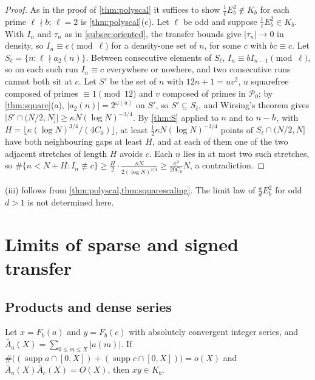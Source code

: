 \documentclass[11pt]{article}
\DeclareMathOperator{\supp}{supp}
\newcommand{\cnt}{\#}
\begin{document}
\begin{proof}
As in the proof of \cref{thm:polyscal} it suffices to show $\frac1\ell E_b^2\notin K_b$ for each prime
$\ell\nmid b$; $\ell=2$ is \cref{thm:polyscal}(c). Let $\ell$ be odd and suppose
$\frac1\ell E_b^2\in K_b$. With $I_n$ and $\tau_n$ as in \cref{subsec:oriented}, the transfer bounds
give $|\tau_n|\to0$ in density, so $I_n\equiv c\pmod\ell$ for a density-one set of $n$, for some $c$
with $bc\equiv c$. Let $S_\ell=\{n:\ell\nmid a_2(n)\}$. Between consecutive elements of $S_\ell$,
$I_n\equiv bI_{n-1}\pmod\ell$, so on each such run $I_n\equiv c$ everywhere or nowhere, and two
consecutive runs cannot both sit at $c$. Let $S'$ be the set of $n$ with $12n+1=uv^2$, $u$ squarefree
composed of primes $\equiv1\pmod{12}$ and $v$ composed of primes in $\mathcal P_0$; by
\cref{thm:square}(a), $|a_2(n)|=2^{\omega(u)}$ on $S'$, so $S'\subseteq S_\ell$, and Wirsing's theorem
gives $|S'\cap(N/2,N]|\ge\kappa N(\log N)^{-3/4}$. By \cref{thm:S} applied to $n$ and to $n-h$, with
$H=\lfloor\kappa(\log N)^{3/4}/(4C_0)\rfloor$, at least $\frac12\kappa N(\log N)^{-3/4}$ points of
$S_\ell\cap(N/2,N]$ have both neighbouring gaps at least $H$, and at each of them one of the two
adjacent stretches of length $H$ avoids $c$. Each $n$ lies in at most two such stretches, so
$\cnt\{n<N+H:I_n\not\equiv c\}\ge\frac H2\cdot\frac{\kappa N}{2(\log N)^{3/4}}\ge\frac{\kappa^2}{20C_0}N$,
a contradiction.
\end{proof}

(iii) follows from \cref{thm:polyscal,thm:squarescaling}. The limit law of
$\frac adE_b^2$ for odd $d>1$ is not determined here.

\section{Limits of sparse and signed transfer}\label{sec:limits}

\subsection{Products and dense series}\label{subsec:products}

\begin{proposition}\label{prop:sumset}
Let $x=F_b(a)$ and $y=F_b(c)$ with absolutely convergent integer series, and
$\bar A_a(X)=\sum_{0\le m\le X}|a(m)|$. If
$\cnt\bigl((\supp a\cap[0,X])+(\supp c\cap[0,X])\bigr)=o(X)$ and $\bar A_a(X)\bar A_c(X)=O(X)$, then
$xy\in K_b$.
\end{proposition}
\end{document}
